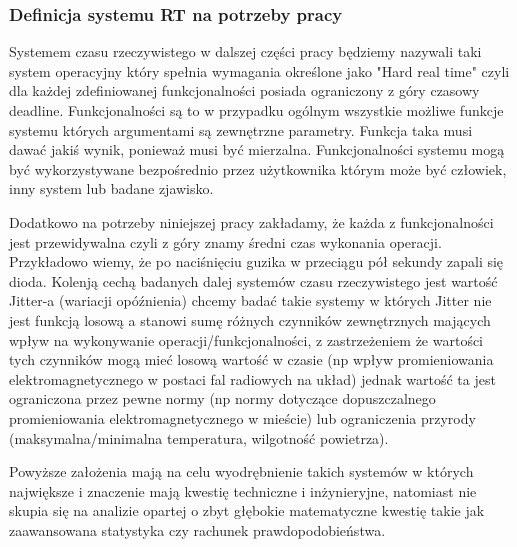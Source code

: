 \subsubsection{Definicja systemu RT na potrzeby pracy}

\par 
\tab Systemem czasu rzeczywistego w dalszej części pracy będziemy nazywali taki system operacyjny który spełnia wymagania określone jako "Hard real time" czyli dla każdej zdefiniowanej funkcjonalności posiada ograniczony z góry czasowy deadline.
Funkcjonalności są to w przypadku ogólnym wszystkie możliwe funkcje systemu których argumentami są zewnętrzne parametry. Funkcja taka musi dawać jakiś wynik, ponieważ musi być mierzalna. Funkcjonalności systemu mogą być wykorzystywane bezpośrednio przez użytkownika którym może być człowiek, inny system lub badane zjawisko.

\par
\tab Dodatkowo na potrzeby niniejszej pracy zakładamy, że każda z funkcjonalności jest przewidywalna czyli z góry znamy średni czas wykonania operacji. Przykładowo wiemy, że po naciśnięciu guzika w przeciągu pół sekundy zapali się dioda.
Kolenją cechą badanych dalej systemów czasu rzeczywistego jest wartość Jitter-a (wariacji opóźnienia) chcemy badać takie systemy w których Jitter nie jest funkcją losową a stanowi sumę różnych czynników zewnętrznych mających wpływ na wykonywanie operacji/funkcjonalności, z zastrzeżeniem że wartości tych czynników mogą mieć losową wartość w czasie (np wpływ promieniowania elektromagnetycznego w postaci fal radiowych na układ) jednak wartość ta jest ograniczona przez pewne normy (np normy dotyczące dopuszczalnego promieniowania elektromagnetycznego w mieście) lub ograniczenia przyrody (maksymalna/minimalna temperatura, wilgotność powietrza).

\par
\tab Powyższe założenia mają na celu wyodrębnienie takich systemów w których największe i znaczenie mają kwestię techniczne i inżynieryjne, natomiast nie skupia się na analizie opartej o zbyt głębokie matematyczne kwestię takie jak zaawansowana statystyka czy rachunek prawdopodobieństwa.

\clearpage